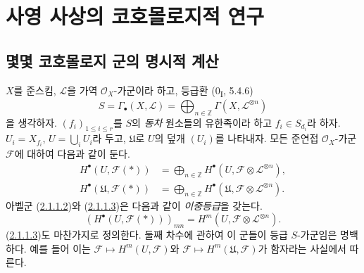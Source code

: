 \section{사영 사상의 코호몰로지적 연구}
\label{section:III.2-fr}

\subsection{몇몇 코호몰로지 군의 명시적 계산}
\label{subsection:III.2.1-fr}

\begin{env}[2.1.1]
\label{III.2.1.1-fr}
$X$를 준스킴, $\mathcal L$을 가역 $\mathcal O_X$-가군이라 하고, 등급환
(0\textsubscript{I}, 5.4.6)
\begin{equation}
\label{III.2.1.1.1-fr}
\tag{2.1.1.1}
S=\Gamma_\bullet(X,\mathcal L)
=\bigoplus_{n\in\mathbb Z}\Gamma(X,\mathcal L^{\otimes n})
\end{equation}
을 생각하자. $(f_i)_{1\leq i\leq r}$를 $S$의 \emph{동차} 원소들의
유한족이라 하고 $f_i\in S_{d_i}$라 하자. $U_i=X_{f_i}$,
$U=\bigcup_iU_i$라 두고, $\mathfrak U$로 $U$의 덮개 $(U_i)$를
나타내자. 모든 준연접 $\mathcal O_X$-가군 $\mathcal F$에 대하여
다음과 같이 둔다.
\begin{align}
\label{III.2.1.1.2-fr}
\tag{2.1.1.2}
H^\bullet(U,\mathcal F(*))
&=\bigoplus_{n\in\mathbb Z}
H^\bullet(U,\mathcal F\otimes\mathcal L^{\otimes n}),\\
\label{III.2.1.1.3-fr}
\tag{2.1.1.3}
H^\bullet(\mathfrak U,\mathcal F(*))
&=\bigoplus_{n\in\mathbb Z}
H^\bullet(\mathfrak U,\mathcal F\otimes\mathcal L^{\otimes n}).
\end{align}
아벨군 (\hyperref[III.2.1.1.2-fr]{2.1.1.2})와
(\hyperref[III.2.1.1.3-fr]{2.1.1.3})은 다음과 같이 \emph{이중등급}을
갖는다.
\[
(H^\bullet(U,\mathcal F(*)))_{mn}
=H^m(U,\mathcal F\otimes\mathcal L^{\otimes n}).
\]
(\hyperref[III.2.1.1.3-fr]{2.1.1.3})도 마찬가지로 정의한다. 둘째
차수에 관하여 이 군들이 등급 $S$-가군임은 명백하다. 예를 들어 이는
$\mathcal F\mapsto H^m(U,\mathcal F)$와
$\mathcal F\mapsto H^m(\mathfrak U,\mathcal F)$가 함자라는 사실에서
따른다.
\end{env}

